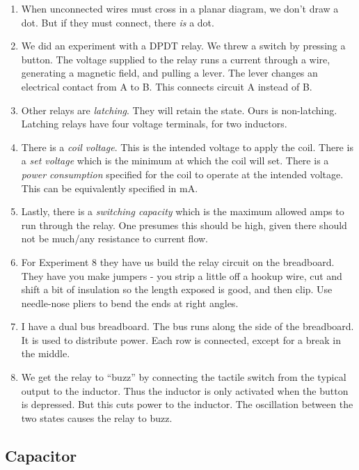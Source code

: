 \documentclass[11pt, oneside]{amsart}
\begin{document}
\begin{enumerate}
  \item When unconnected wires must cross in a planar diagram, we don't
  draw a dot. But if they must connect, there \emph{is} a dot.

  \item We did an experiment with a DPDT relay. We threw a switch by
  pressing a button. The voltage supplied to the relay runs a current
  through a wire, generating a magnetic field, and pulling a lever. The
  lever changes an electrical contact from A to B. This connects circuit
  A instead of B.

  \item Other relays are \emph{latching}. They will retain the state.
  Ours is non-latching. Latching relays have four voltage terminals, for
  two inductors.

  \item There is a \emph{coil voltage}. This is the intended voltage to
  apply the coil. There is a \emph{set voltage} which is the minimum at
  which the coil will set. There is a \emph{power consumption} specified
  for the coil to operate at the intended voltage. This can be
  equivalently specified in mA.

  \item Lastly, there is a \emph{switching capacity} which is the
  maximum allowed amps to run through the relay. One presumes this
  should be high, given there should not be much/any resistance to
  current flow.

  \item For Experiment 8 they have us build the relay circuit on the
  breadboard. They have you make jumpers - you strip a little off a
  hookup wire, cut and shift a bit of insulation so the length exposed
  is good, and then clip. Use needle-nose pliers to bend the ends at
  right angles.

  \item I have a dual bus breadboard. The bus runs along the side of the
  breadboard. It is used to distribute power. Each row is connected,
  except for a break in the middle.

  \item We get the relay to ``buzz'' by connecting the tactile switch
  from the typical output to the inductor. Thus the inductor is only
  activated when the button is depressed. But this cuts power to the
  inductor. The oscillation between the two states causes the relay to
  buzz.
\end{enumerate}

\subsection{Capacitor}
\end{document}
